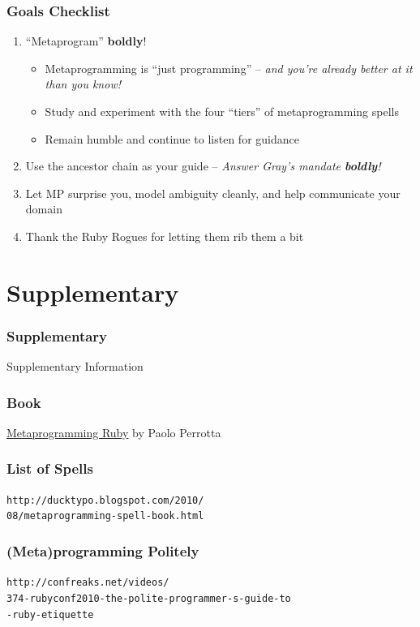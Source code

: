\documentclass[slidestop,compress,mathserif]{beamer}
\begin{document}
\begin{frame}
	\frametitle{Goals Checklist}
	\begin{enumerate}
		\item ``Metaprogram'' \textbf{boldly}!
		\begin{itemize}
			\pause
			\item Metaprogramming is ``just programming'' -- \emph{and you're already better at it than you know!}
			\pause
			\item Study and experiment with the four ``tiers'' of metaprogramming spells
			\pause
			\item Remain humble and continue to listen for guidance
		\end{itemize}
		\pause
		\item Use the ancestor chain as your guide -- \emph{Answer Gray's mandate \textbf{boldly}!}
		\pause
		\item Let MP surprise you, model ambiguity cleanly, and help communicate your domain
		\pause
		\item Thank the Ruby Rogues for letting them rib them a bit
	\end{enumerate}
\end{frame}

\section{Supplementary} %
\label{sec:supplementary}

\begin{frame}
	\frametitle{Supplementary}
	\begin{center}
		Supplementary Information
	\end{center}
\end{frame}

\begin{frame}
	\frametitle{Book}
	\underline{Metaprogramming Ruby} by Paolo Perrotta
\end{frame}

\begin{frame}
	\frametitle{List of Spells}
	\texttt{http://ducktypo.blogspot.com/2010/\\08/metaprogramming-spell-book.html}
\end{frame}

\begin{frame}
	\frametitle{(Meta)programming Politely}
	\texttt{http://confreaks.net/videos/\\374-rubyconf2010-the-polite-programmer-s-guide-to\\-ruby-etiquette}
\end{frame}
\end{document}
